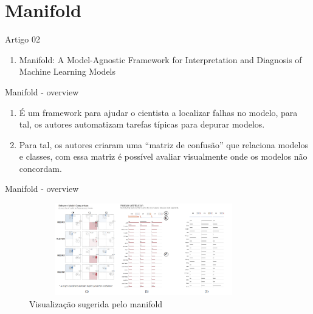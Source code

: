 \section{Manifold}

\begin{frame}
	\begin{block}{Artigo 02}
	\begin{enumerate}
		\item Manifold: A Model-Agnostic Framework for Interpretation and Diagnosis of Machine Learning Models \cite{Manifold}
	\end{enumerate}
	\end{block}
\end{frame}


\begin{frame}
	\begin{block}{Manifold - overview}
		\begin{enumerate}
			\item É um framework para ajudar o cientista a localizar falhas no modelo, para tal, os autores automatizam tarefas típicas para depurar modelos.
			\item Para tal, os autores criaram uma ``matriz de confusão'' que relaciona modelos e classes, com essa matriz é possível avaliar visualmente onde os modelos não concordam.
		\end{enumerate}
	\end{block}
\end{frame}


\begin{frame}
	\begin{block}{Manifold - overview}
				\begin{figure}[!htb]
			\centering	  				
			\includegraphics[height=4cm, width = 10cm]{./pic/manifold.png}
			\caption{Visualização sugerida pelo manifold \cite{Manifold}}
			\label{fig_ds_process}
		\end{figure}	
	\end{block}
\end{frame}


